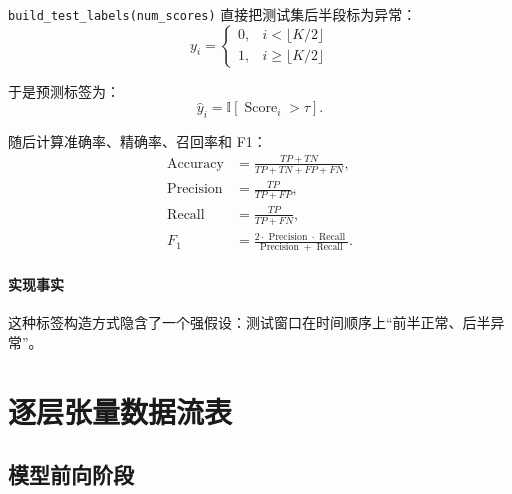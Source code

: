\documentclass[UTF8]{ctexart}
\begin{document}
\texttt{build\_test\_labels(num\_scores)} 直接把测试集后半段标为异常：
\begin{equation}
    y_i =
    \begin{cases}
        0, & i < \lfloor K/2 \rfloor \\
        1, & i \ge \lfloor K/2 \rfloor
    \end{cases}
\end{equation}

于是预测标签为：
\begin{equation}
    \hat{y}_i = \mathbb{I}[\operatorname{Score}_i > \tau].
\end{equation}

随后计算准确率、精确率、召回率和 F1：
\begin{align}
    \operatorname{Accuracy} &= \frac{TP + TN}{TP + TN + FP + FN}, \\
    \operatorname{Precision} &= \frac{TP}{TP + FP}, \\
    \operatorname{Recall} &= \frac{TP}{TP + FN}, \\
    F_1 &= \frac{2 \cdot \operatorname{Precision} \cdot \operatorname{Recall}}{\operatorname{Precision} + \operatorname{Recall}}.
\end{align}

\paragraph{实现事实}
这种标签构造方式隐含了一个强假设：测试窗口在时间顺序上“前半正常、后半异常”。

\section{逐层张量数据流表}

\subsection{模型前向阶段}
\end{document}
